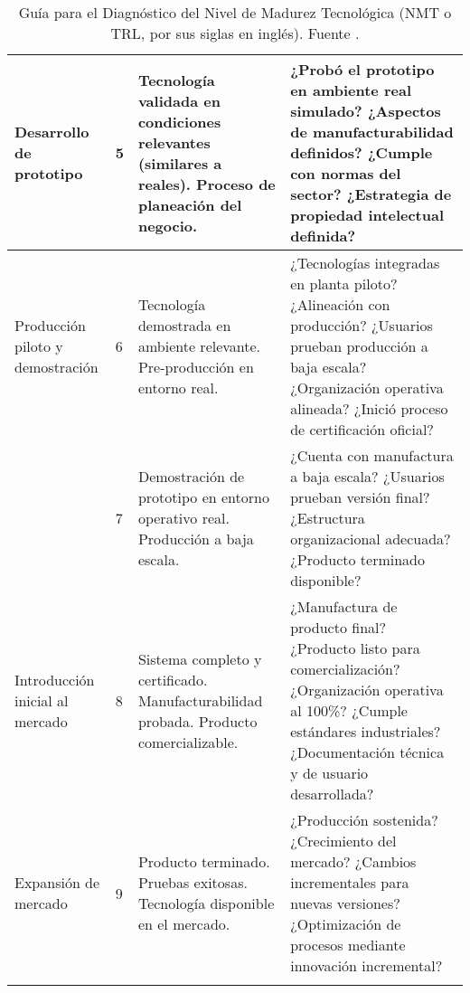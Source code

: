 \begin{longtable}{|p{2.5cm}|p{0.5cm}|p{4cm}|p{8.5cm}|}
Desarrollo de prototipo & 5 &
Tecnología validada en condiciones relevantes (similares a reales). Proceso de planeación del negocio. &
¿Probó el prototipo en ambiente real simulado? \newline
¿Aspectos de manufacturabilidad definidos? \newline
¿Cumple con normas del sector? \newline
¿Estrategia de propiedad intelectual definida? \\
\hline

Producción piloto y demostración & 6 &
Tecnología demostrada en ambiente relevante. Pre-producción en entorno real. &
¿Tecnologías integradas en planta piloto? \newline
¿Alineación con producción? \newline
¿Usuarios prueban producción a baja escala? \newline
¿Organización operativa alineada? \newline
¿Inició proceso de certificación oficial? \\
\hline

& 7 &
Demostración de prototipo en entorno operativo real. Producción a baja escala. &
¿Cuenta con manufactura a baja escala? \newline
¿Usuarios prueban versión final? \newline
¿Estructura organizacional adecuada? \newline
¿Producto terminado disponible? \\
\hline

Introducción inicial al mercado & 8 &
Sistema completo y certificado. Manufacturabilidad probada. Producto comercializable. &
¿Manufactura de producto final? \newline
¿Producto listo para comercialización? \newline
¿Organización operativa al 100\%? \newline
¿Cumple estándares industriales? \newline
¿Documentación técnica y de usuario desarrollada? \\
\hline

Expansión de mercado & 9 &
Producto terminado. Pruebas exitosas. Tecnología disponible en el mercado. &
¿Producción sostenida? \newline
¿Crecimiento del mercado? \newline
¿Cambios incrementales para nuevas versiones? \newline
¿Optimización de procesos mediante innovación incremental? \\
\hline

\caption{Guía para el Diagnóstico del Nivel de Madurez Tecnológica (NMT o TRL, por sus siglas en inglés). Fuente \cite{SECIHTIConvocatorias}.}
\label{m19}
\end{longtable}

